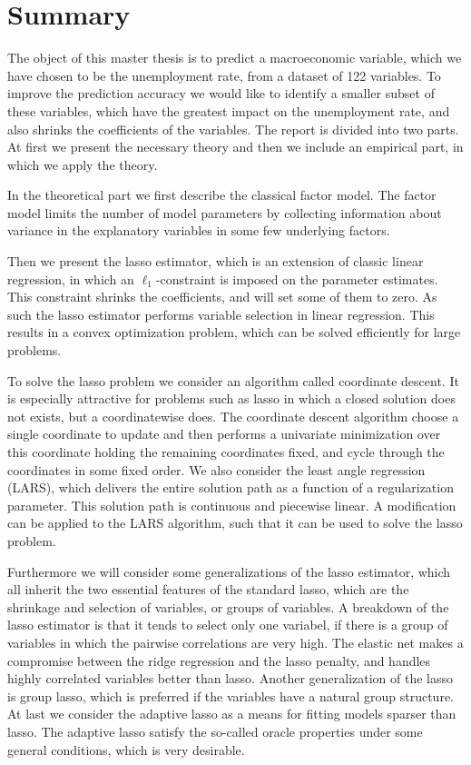 \chapter{Summary}
%
The object of this master thesis is to predict a macroeconomic variable, which we have chosen to be the unemployment rate, from a dataset of 122 variables.
To improve the prediction accuracy we would like to identify a smaller subset of these variables, which have the greatest impact on the unemployment rate, and also shrinks the coefficients of the variables.
The report is divided into two parts. 
At first we present the necessary theory and then we include an empirical part, in which we apply the theory.

In the theoretical part we first describe the classical factor model.
The factor model limits the number of model parameters by collecting information about variance in the explanatory variables in some few underlying factors.

Then we present the lasso estimator, which is an extension of classic linear regression, in which an \(\ell_1\)-constraint is imposed on the parameter estimates.
This constraint shrinks the coefficients, and will set some of them to zero.
As such the lasso estimator performs variable selection in linear regression.
This results in a convex optimization problem, which can be solved efficiently for large problems.

To solve the lasso problem we consider an algorithm called coordinate descent.
It is especially attractive for problems such as lasso in which a closed solution does not exists, but a coordinatewise does.
The coordinate descent algorithm choose a single coordinate to update and then performs a univariate minimization over this coordinate holding the remaining coordinates fixed, and cycle through the coordinates in some fixed order.
We also consider the least angle regression (LARS), which delivers the entire solution path as a function of a regularization parameter.
This solution path is continuous and piecewise linear.
A modification can be applied to the LARS algorithm, such that it can be used to solve the lasso problem.

Furthermore we will consider some generalizations of the lasso estimator, which all inherit the two essential features of the standard lasso, which are the shrinkage and selection of variables, or groups of variables.
A breakdown of the lasso estimator is that it tends to select only one variabel, if there is a group of variables in which the pairwise correlations are very high.
The elastic net makes a compromise between the ridge regression and the lasso penalty, and handles highly correlated variables better than lasso. 
Another generalization of the lasso is group lasso, which is preferred if the variables have a natural group structure.
At last we consider the adaptive lasso as a means for fitting models sparser than lasso.
The adaptive lasso satisfy the so-called oracle properties under some general conditions, which is very desirable. 

